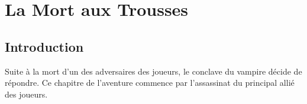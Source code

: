 \section{La Mort aux Trousses}

\subsection*{Introduction}

Suite à la mort d'un des adversaires des joueurs, le conclave du vampire décide de répondre.
Ce chapitre de l'aventure commence par l'assassinat du principal allié des joueurs.
